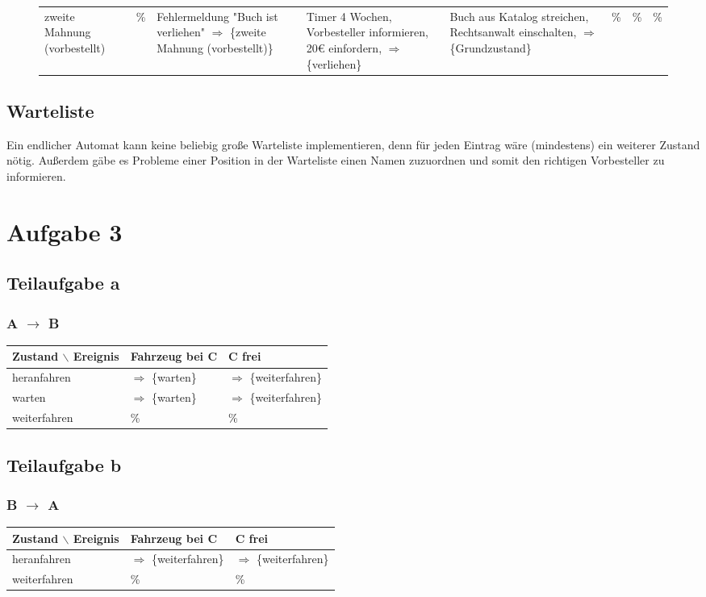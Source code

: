 \documentclass[koma,a4paper,10pt]{org-article}
\begin{document}
\begin{sidewaysfigure}
\begin{adjustbox}{width=\textwidth}
\begin{tabular}{|p{3cm}|p{3cm}|p{3cm}|p{3cm}|p{3cm}|p{3cm}|p{3cm}|p{3cm}|}
zweite Mahnung (vorbestellt) & \% & Fehlermeldung "Buch ist verliehen" $\Rightarrow$ \{zweite Mahnung (vorbestellt)\} & Timer 4 Wochen, Vorbesteller informieren, 20€ einfordern, $\Rightarrow$ \{verliehen\} & Buch aus Katalog streichen, Rechtsanwalt einschalten, $\Rightarrow$ \{Grundzustand\} & \% & \% & \%\\
\end{tabular}
\end{adjustbox}
\end{sidewaysfigure}
\pagebreak
\subsection{Warteliste}
\label{sec-3-1}
Ein endlicher Automat kann keine beliebig große Warteliste implementieren, denn für jeden Eintrag wäre (mindestens) ein weiterer Zustand nötig. Außerdem gäbe es Probleme einer Position in der Warteliste einen Namen zuzuordnen und somit den richtigen Vorbesteller zu informieren.
\section{Aufgabe 3}
\label{sec-4}
\subsection{Teilaufgabe a}
\label{sec-4-1}
\subsubsection{A $\to$ B}
\label{sec-4-1-1}
\begin{center}
\begin{tabular}{lll}
Zustand $\backslash$ Ereignis & Fahrzeug bei C & C frei\\
\hline
heranfahren & $\Rightarrow$ \{warten\} & $\Rightarrow$ \{weiterfahren\}\\
warten & $\Rightarrow$ \{warten\} & $\Rightarrow$ \{weiterfahren\}\\
weiterfahren & \% & \%\\
\end{tabular}
\end{center}
\subsection{Teilaufgabe b}
\label{sec-4-2}
\subsubsection{B $\to$ A}
\label{sec-4-2-1}
\begin{center}
\begin{tabular}{lll}
Zustand $\backslash$ Ereignis & Fahrzeug bei C & C frei\\
\hline
heranfahren & $\Rightarrow$ \{weiterfahren\} & $\Rightarrow$ \{weiterfahren\}\\
weiterfahren & \% & \%\\
\end{tabular}
\end{center}
\end{document}
